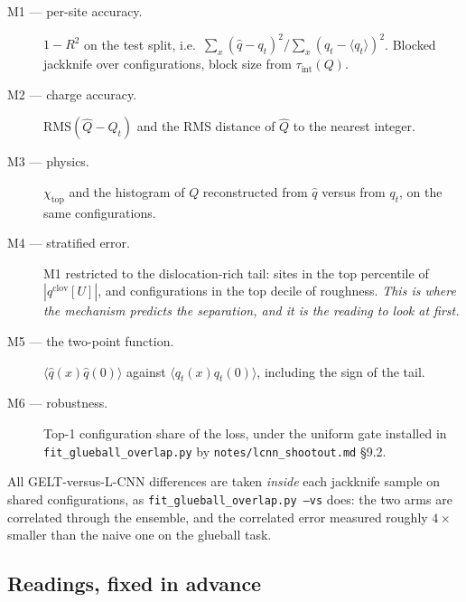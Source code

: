 \documentclass[11pt,a4paper]{article}
\newcommand{\qhat}{\hat{q}}
\newcommand{\Qhat}{\hat{Q}}
\newcommand{\qflow}{q_{t}}
\newcommand{\Qflow}{Q_{t}}
\begin{document}
\begin{description}
\item[M1 --- per-site accuracy.] $1 - R^2$ on the test split, i.e.\
  $\sum_x (\qhat - \qflow)^2 / \sum_x (\qflow - \langle \qflow\rangle)^2$.
  Blocked jackknife over configurations, block size from $\tau_{\mathrm{int}}(Q)$.
\item[M2 --- charge accuracy.] $\mathrm{RMS}(\Qhat - \Qflow)$ and the RMS
  distance of $\Qhat$ to the nearest integer.
\item[M3 --- physics.] $\chi_{\mathrm{top}}$ and the histogram of $Q$
  reconstructed from $\qhat$ versus from $\qflow$, on the same configurations.
\item[M4 --- stratified error.] M1 restricted to the dislocation-rich tail:
  sites in the top percentile of $|q^{\mathrm{clov}}[U]|$, and configurations in
  the top decile of roughness. \emph{This is where the mechanism predicts the
  separation, and it is the reading to look at first.}
\item[M5 --- the two-point function.] $\langle \qhat(x)\qhat(0)\rangle$ against
  $\langle \qflow(x)\qflow(0)\rangle$, including the sign of the tail.
\item[M6 --- robustness.] Top-1 configuration share of the loss, under the
  uniform gate installed in \texttt{fit\_glueball\_overlap.py} by
  \texttt{notes/lcnn\_shootout.md} \S9.2.
\end{description}

All GELT-versus-L-CNN differences are taken \emph{inside} each jackknife sample
on shared configurations, as \texttt{fit\_glueball\_overlap.py --vs} does: the
two arms are correlated through the ensemble, and the correlated error measured
roughly $4\times$ smaller than the naive one on the glueball task.

\subsection{Readings, fixed in advance}
\label{sec:readings}
\end{document}
